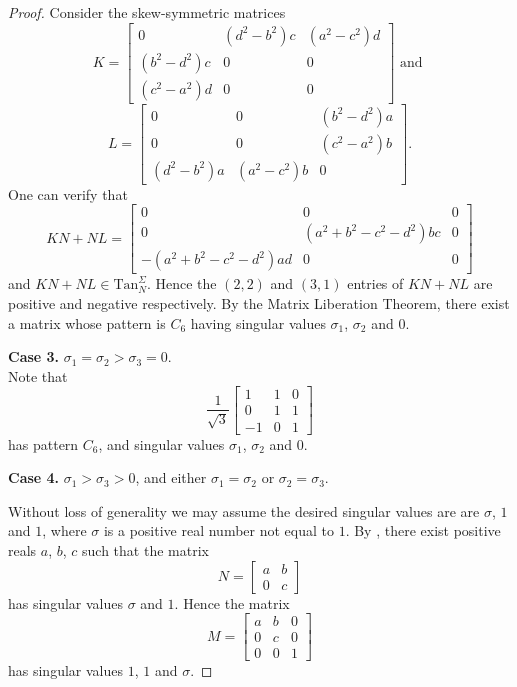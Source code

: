 \documentclass[10pt,a4paper]{amsart}
\begin{document}
\begin{proof}
Consider the skew-symmetric matrices
\[
K=\left[ 
\begin{array}{ccc}
0 & (d^2-b^2)c & (a^2-c^2)d \\
(b^2-d^2)c & 0 & 0 \\
(c^2-a^2)d & 0 &0 
\end{array} \right] \mbox{ and } 
\]
\[   
L= 
\left[
\begin{array}{ccc}
            0    &          0  & (b^2 - d^2)a\\
             0   &0 & (c^2 - a^2)b\\
(d^2 - b^2)a & (a^2 - c^2)b &              0
\end{array} \right]. 
\]
One can verify that 
\[ 
KN+NL = 
\left[
\begin{array}{ccc}
0 & 0 & 0\\
0 &  (a^2 + b^2 - c^2 - d^2)bc &  0 \\
-(a^2 + b^2 - c^2 - d^2)ad &  0 & 0
\end{array} 
\right]
\] 
and $KN+NL\in \mbox{Tan}_N^{\Sigma}$.
Hence the $(2,2)$ and $(3,1)$ entries of $KN+NL$ are positive and negative respectively.
By the Matrix Liberation Theorem, there exist a matrix whose  pattern is
$C_6$
having singular values $\sigma_1$, $\sigma_2$ and $0$. 

\bigskip\noindent
{\bf Case 3.} $ \sigma_1=\sigma_2> \sigma_3=0$. 
\\ 
Note that  
\[ 
\frac{1}{\sqrt{3}}\left[ 
\begin{array}{rrr}
1 & 1 & 0 \\
0 & 1 & 1 \\
-1 & 0 & 1
\end{array} 
\right]
\]
has pattern $C_6$, and singular values $\sigma_1$, $\sigma_2$ and $0$.

\bigskip\noindent
{\bf Case 4.} $\sigma_1>\sigma_3>0$, and either 
$\sigma_1=\sigma_2$ or $\sigma_2=\sigma_3$.

Without loss of generality we may assume the desired 
singular values are 
 are $\sigma$, $1$ and $1$,
where $\sigma$ is a positive real number not equal to $1$. 
By , there exist positive reals $a$, $b$, $c$ such that 
the matrix 
\[ 
N=\left[ 
\begin{array}{cc}
a& b 
\\
0 & c
\end{array}
\right] 
\] 
has singular values $\sigma$ and $1$. Hence the matrix 
\[ 
M=\left[
\begin{array}{ccc}
a & b & 0 
\\
0 & c & 0 \\
0 & 0 & 1 
\end{array}
\right] 
\]
has singular values $1$, $1$ and $\sigma$.


\end{proof}
\end{document}
